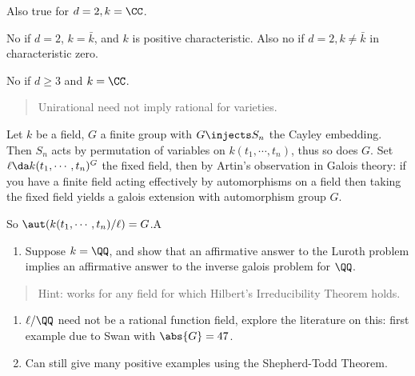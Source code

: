 \begin{theorem}[Castelnuovo]

Also true for \(d=2, k=\CC\).

\end{theorem}

\begin{theorem}[Zariski]

No if \(d= 2\), \(k=\bar k\), and \(k\) is positive characteristic. Also
no if \(d=2, k\neq \bar k\) in characteristic zero.

\end{theorem}

\begin{theorem}

No if \(d\geq 3\) and \(k= \CC\).

\end{theorem}

\begin{quote}
Unirational need not imply rational for varieties.
\end{quote}

\begin{exercise}

Let \(k\) be a field, \(G\) a finite group with \(G\injects S_n\) the
Cayley embedding. Then \(S_n\) acts by permutation of variables on
\(k(t_1, \cdots, t_n)\), thus so does \(G\). Set
\(\ell \da k(t_1, \cdots, t_n)^G\) the fixed field, then by Artin's
observation in Galois theory: if you have a finite field acting
effectively by automorphisms on a field then taking the fixed field
yields a galois extension with automorphism group \(G\).

So \(\aut(k(t_1, \cdots, t_n)/ \ell) = G\).A

\begin{enumerate}
\def\labelenumi{\alph{enumi}.}
\tightlist
\item
  Suppose \(k=\QQ\), and show that an affirmative answer to the Luroth
  problem implies an affirmative answer to the inverse galois problem
  for \(\QQ\).
\end{enumerate}

\begin{quote}
Hint: works for any field for which Hilbert's Irreducibility Theorem
holds.
\end{quote}

\begin{enumerate}
\def\labelenumi{\alph{enumi}.}
\setcounter{enumi}{1}
\item
  \(\ell /\QQ\) need not be a rational function field, explore the
  literature on this: first example due to Swan with \(\abs{G} = 47\).
\item
  Can still give many positive examples using the Shepherd-Todd Theorem.
\end{enumerate}

\end{exercise}

